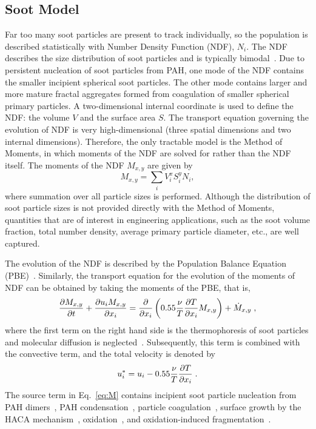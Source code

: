\subsection{Soot Model}\label{sec:biofuel-soot_model}

Far too many soot particles are present to track individually, so the population is described statistically with Number Density Function (NDF), $N_i$.  The NDF describes the size distribution of soot particles and is typically bimodal~\cite{zhao05}.  Due to persistent nucleation of soot particles from PAH, one mode of the NDF contains the smaller incipient spherical soot particles.  The other mode contains larger and more mature fractal aggregates formed from coagulation of smaller spherical primary particles.  A two-dimensional internal coordinate is used to define the NDF: the volume $V$ and the surface area $S$.  The transport equation governing the evolution of NDF is very high-dimensional (three spatial dimensions and two internal dimensions).  Therefore, the only tractable model is the Method of Moments, in which moments of the NDF are solved for rather than the NDF itself.  The moments of the NDF $M_{x,y}$ are given by
\begin{equation}\label{eq:defM}
M_{x,y} = \sum_{i} V_i^x S_i^y N_i,
\end{equation}
where summation over all particle sizes is performed.  Although the distribution of soot particle sizes is not provided directly with the Method of Moments, quantities that are of interest in engineering applications, such as the soot volume fraction, total number density, average primary particle diameter, etc., are well captured.  

The evolution of the NDF is described by the Population Balance Equation (PBE)~\cite{friedlander00}.  Similarly, the transport equation for the evolution of the moments of NDF can be obtained by taking the moments of the PBE, that is, 
\begin{equation}\label{eq:M}
\frac{\partial M_{x,y}}{\partial t} + \frac{\partial u_iM_{x,y}}{\partial x_i} = \frac{\partial }{\partial x_i}\left(0.55 \frac{\nu}{T} \frac{\partial T}{\partial x_i} M_{x,y}\right) + \dot{M}_{x,y}\;,
\end{equation}
where the first term on the right hand side is the thermophoresis of soot particles\cite{waldmann66} and molecular diffusion is neglected~\cite{bisetti12}.  Subsequently, this term is combined with the convective term, and the total velocity is denoted by
\begin{equation}\label{eq:therm}
  u_i^\ast = u_i - 0.55 \frac{\nu}{T} \frac{\partial T}{\partial x_i}\;.
\end{equation}
The source term in Eq.~\ref{eq:M} contains incipient soot particle nucleation from PAH dimers~\cite{schuetz02,wong09,blanquart09c}, PAH condensation~\cite{park03,mitchell98,mitchell03}, particle coagulation~\cite{mueller09b}, surface growth by the HACA mechanism~\cite{frenklach91}, oxidation~\cite{kazakov95,neoh81}, and oxidation-induced fragmentation~\cite{mueller11a}.  

